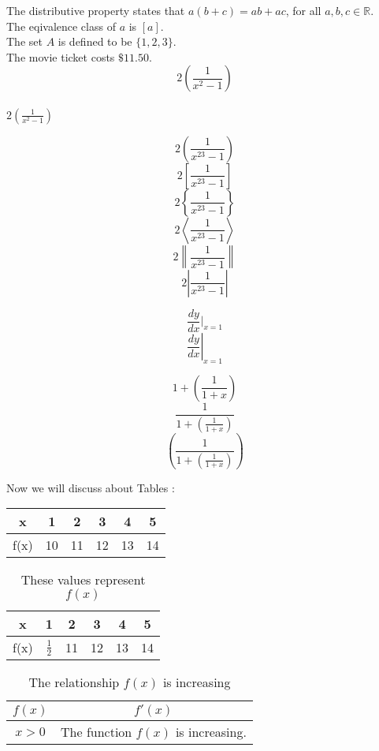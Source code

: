 \documentclass[11pt]{article}
\begin{document}
The distributive property states that $a(b+c) = ab+ac$, for all $a,b,c \in \mathbb{R}$.\\[6pt]
The eqivalence class of $a$ is $[a]$.\\[6pt]
The set $A$ is defined to be $\{1,2,3\}$.\\[6pt]
The movie ticket costs $\$11.50$.\\[6pt]

$$2(\frac{1}{x^2-1})$$\\
$2(\frac{1}{x^2-1})$

$$2\left(\frac{1}{x^{23}-1}\right)$$
$$2\left[\frac{1}{x^{23}-1}\right]$$
$$2\left\{\frac{1}{x^{23}-1}\right\}$$
$$2\left\langle\frac{1}{x^{23}-1}\right\rangle$$
$$2\left\|\frac{1}{x^{23}-1}\right\|$$
$$2\left|\frac{1}{x^{23}-1}\right|$$

$$\frac{dy}{dx}|_{x=1}$$
$$\left.\frac{dy}{dx}\right|_{x=1}$$

$$1+\left(\frac{1}{1+x}\right)$$
$$\frac{1}{1+\left(\frac{1}{1+x}\right)}$$
$$\left(\frac{1}{1+\left(\frac{1}{1+x}\right)}\right)$$




Now we will discuss about Tables : \\

\begin{tabular}{|c||c|c|c|c|c|}
\hline
x & 1 & 2 & 3 & 4 & 5\\ \hline
f(x) & 10 & 11 & 12 & 13 & 14\\ \hline
\end{tabular}

\vspace{1cm}


\begin{table}[H]
\centering
\def\arraystretch{1.5}
\begin{tabular}{|c||c|c|c|c|c|}
\hline
x & 1 & 2 & 3 & 4 & 5\\ \hline
f(x) & $\frac{1}{2}$ & 11 & 12 & 13 & 14\\ \hline
\end{tabular}
\caption{These values represent $f(x)$}
\end{table}



\begin{table}[H]
\centering
\def\arraystretch{1.5}
\begin{tabular}{|c||c|}
\hline
$f(x)$ & $f'(x)$\\ \hline
$x>0$ & The function $f(x)$ is increasing.\\ \hline
\end{tabular}
\caption{The relationship $f(x)$ is increasing}
\end{table}
\end{document}
